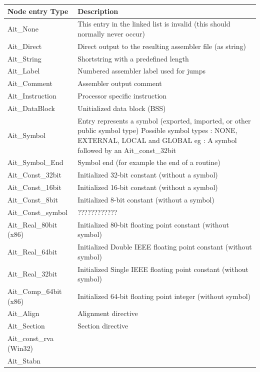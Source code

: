\documentclass [a4paper,12pt]{article}
\begin{document}
\begin{longtable}{|l|p{10cm}|}
\hline
Node entry Type   & Description \\
\hline
\endhead
\hline
\endfoot
Ait{\_}None&
    This entry in the linked list is invalid (this should
    normally never occur) \\
Ait{\_}Direct&
    Direct output to the resulting assembler file (as string) \\
Ait{\_}String&
    Shortstring with a predefined length \\
Ait{\_}Label&
    Numbered assembler label used for jumps \\
Ait{\_}Comment&
    Assembler output comment \\
Ait{\_}Instruction&
    Processor specific instruction \\
Ait{\_}DataBlock&
    Unitialized data block (BSS) \\
Ait{\_}Symbol&
    Entry represents a symbol (exported, imported, or other public
    symbol type) \newline
    Possible symbol types : NONE, EXTERNAL, LOCAL and GLOBAL \newline
    eg : A symbol followed by an Ait{\_}const{\_}32bit \\
Ait{\_}Symbol{\_}End &
    Symbol end (for example the end of a routine) \\
Ait{\_}Const{\_}32bit&
    Initialized 32-bit constant (without a symbol) \\
Ait{\_}Const{\_}16bit&
    Initialized 16-bit constant (without a symbol) \\
Ait{\_}Const{\_}8bit&
    Initialized 8-bit constant (without a symbol) \\
Ait{\_}Const{\_}symbol & ???????????? \\
Ait{\_}Real{\_}80bit (x86)&
    Initialized 80-bit floating point constant (without symbol) \\
Ait{\_}Real{\_}64bit&
    Initialized Double IEEE floating point constant (without symbol) \\
Ait{\_}Real{\_}32bit&
    Initialized Single IEEE floating point constant (without symbol) \\
Ait{\_}Comp{\_}64bit (x86)&
    Initialized 64-bit floating point integer (without symbol) \\
Ait{\_}Align&
    Alignment directive \\
Ait{\_}Section&
    Section directive \\
Ait{\_}const{\_}rva (Win32)&  \\
Ait{\_}Stabn &

\end{longtable}
\end{document}
